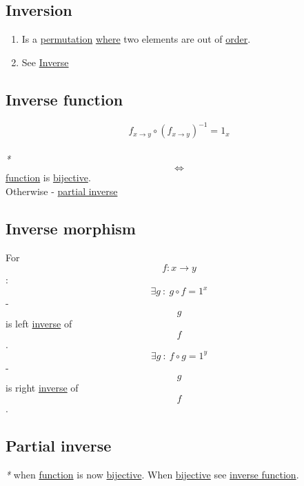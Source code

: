 \documentclass[11pt]{article}
\begin{document}
\subsection{\label{org4fe1452}Inversion}
\label{sec:org83ecd1b}

\begin{enumerate}
\item Is a \hyperref[org2357754]{permutation} \hyperref[org3e5903d]{where} two elements are out of \hyperref[orgc0a359b]{order}.\\

\item See \hyperref[org0da4e7e]{Inverse}\\
\end{enumerate}

\subsection{\label{org27bfad4}Inverse function}
\label{sec:org395be48}

$$ f_{x \to y} \circ ({f_{x \to y}})^{-1} = {1}_{x} $$\\

\emph{*} $$ \iff $$ \hyperref[orge15bc14]{function} is \hyperref[org13a0cd3]{bijective}.\\
Otherwise - \hyperref[org3f6b0ce]{partial inverse}\\

\subsection{\label{org28f7b54}Inverse morphism}
\label{sec:org64cdab8}
For $$ f: x \to y $$:\\
$$ \exists g \ : \ g \circ f = 1^{x} $$ - $$ g $$ is left \hyperref[org0da4e7e]{inverse} of $$ f $$.\\
$$ \exists g \ : \ f \circ g = 1^{y} $$ - $$ g $$ is right \hyperref[org0da4e7e]{inverse} of $$ f $$.\\

\subsection{\label{org3f6b0ce}Partial inverse}
\label{sec:org782dc78}

\emph{*} when \hyperref[orge15bc14]{function} is now \hyperref[org13a0cd3]{bijective}. When \hyperref[org13a0cd3]{bijective} see \hyperref[org27bfad4]{inverse function}.\\
\end{document}
